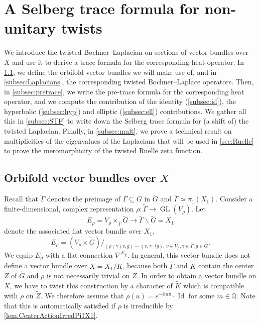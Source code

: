 \documentclass[10pt]{amsart}
\theoremstyle{plain}
\theoremstyle{definition}
\theoremstyle{remark}
\newcommand{\Q}{\mathbb{Q}}
\DeclareMathOperator{\GL}{GL}
\DeclareMathOperator{\Id}{Id}
\numberwithin{equation}{section}
\begin{document}
\section{A Selberg trace formula for non-unitary twists}
\label{sec:STF}
We introduce the twisted Bochner--Laplacian on sections of vector bundles over~$X$ and use it to derive a trace formula for the corresponding heat operator. In \cref{subsec:vect},
we define the orbifold vector bundles we will make use of, and in \cref{subsec:Laplacians}, the corresponding twisted Bochner--Laplace operators. Then, in \cref{subsec:pretrace}, we write the pre-trace formula for the corresponding heat operator, and we compute the contribution of the identity (\cref{subsec:id}), the hyperbolic (\cref{subsec:hyp}) and elliptic (\cref{subsec:ell}) contributions. We gather all this in \cref{subsec:STF} to write down the Selberg trace formula for (a shift of) the twisted Laplacian. Finally, in \cref{subsec:mult}, we prove a technical result on multiplicities of the eigenvalues of the Laplacians that will be used in \cref{sec:Ruelle} to prove the meromorphicity of the twisted Ruelle zeta function.

\subsection{Orbifold vector bundles over $X$}
\label{subsec:vect}

Recall that $\widetilde{\Gamma}$ denotes the preimage of $\Gamma\subseteq G$ in $\widetilde{G}$ and $\widetilde{\Gamma}\simeq\pi_1(X_1)$. Consider a finite-dimensional, complex representation $\rho:\widetilde{\Gamma}\to\GL(V_\rho)$. Let
\[
E_\rho = V_\rho\times_{\widetilde{\Gamma}}\widetilde{G}\to\widetilde{\Gamma}\backslash\widetilde{G}=X_1
\]
denote the associated flat vector bundle over $X_1$, \ie
\[
E_\rho = (V_\rho\times\widetilde{G})/_{(\rho(\gamma)v,g)\sim(v,\gamma^{-1}g),\,v\in V_\rho,\gamma\in\widetilde{\Gamma},g\in\widetilde{G}}.
\]
We equip $E_\rho$ with a flat connection $\nabla^{E_\chi}$. In general, this vector bundle does not define a vector bundle over $X=X_1/\widetilde{K}$, because both $\widetilde{\Gamma}$ and $\widetilde{K}$ contain the center $\widetilde{Z}$ of $\widetilde{G}$ and $\rho$ is not necessarily trivial on $\widetilde{Z}$. In order to obtain a vector bundle on $X$, we have to twist this construction by a character of $\widetilde{K}$ which is compatible with $\rho$ on $\widetilde{Z}$. We therefore assume that $\rho(u)=e^{-im\pi} \cdot \Id$ for some $m\in\Q$. Note that this is automatically satisfied if $\rho$ is irreducible by \cref{lem:CenterActionIrredPi1X1}.
\end{document}
